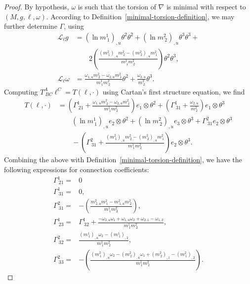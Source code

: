 \documentclass{article}
\newcommand{\ai}{A}
\newcommand{\bb}{B}
\newcommand{\cc}{C}
\theoremstyle{definition}
\theoremstyle{remark}
\begin{document}
\begin{proof}
    By hypothesis, $\omega$ is such that the torsion of $\nabla$ is minimal with respect to $(M,g,\ell,\omega)$. According to Definition~\ref{minimal-torsion-definition}, we may further determine $\Gamma$, using
    \begin{equation} \label{lie-derivs}
    \begin{aligned}
        \mathcal{L}_{\ell}g &= (\ln m^1_{~1})_{,u} \theta^2 \theta^2 + (\ln m^2_{~2})_{,u} \theta^3 \theta^3 + \\
        &\quad \quad 2 \left(\frac{(m^2_{~1})_{,u} m^2_{~2} - (m^2_{~2})_{,u} m^2_{~1}}{m^1_{~1} m^2_{~2}} \right) \theta^2 \theta^3, \\
        \mathcal{L}_\ell \omega &= \frac{\omega_{1,u} m^2_{~2} - \omega_{2,u} m^2_{~1}}{m^1_{~1} m^2_{~2}} \theta^2 + \frac{\omega_{2,u}}{m^2_{~2}} \theta^3.
    \end{aligned}
    \end{equation}
    Computing $T^\ai_{~\bb \cc}\ell^\cc = T(\ell, \cdot)$ using Cartan's first structure equation, we find
    \begin{equation}
    \begin{aligned}
        T(\ell,\cdot) &= \left( \Gamma^1_ {~21} + \frac{ \omega_{1,u} m^2_{~2}-\omega_{2,u}m^2_{~1}}{m^1_{~1} m^2_{~2}} \right) e_1 \otimes \theta^2 + \left(  \Gamma^1_ {~31} +\frac{\omega_{2,u}}{m^2_{~2}} \right) e_1 \otimes \theta^3 \\
        &\quad \quad  (\ln m^1_{~1})_{,u} e_2 \otimes \theta^2 + (\ln m^2_{~2})_{,u} e_3 \otimes \theta^3 + \Gamma^2_{~31} e_2 \otimes \theta^3 \\
        &\quad \quad -\left( \Gamma^2_{~31} +\frac{(m^2_{~1})_{,u} m^2_{~2} - (m^2_{~2})_{,u} m^2_{~1}}{m^1_{~1} m^2_{~2}} \right) e_2 \otimes \theta^3.
    \end{aligned}
    \end{equation}
    Combining the above with Definition~\ref{minimal-torsion-definition},
    we have the following expressions for connection coefficients: 
    \begin{equation}
    \begin{aligned}
        \Gamma^1_{~21} =& 0 \\ 
        \Gamma^1_{~31} =& 0, \\
         \Gamma^2_ {~31} =& -\left(\frac{m^2_{~2,u} m^2_{~1}- m^2_{~1,u} m^2_{~2} }{m^1_{~1} m^2_{~2}}\right), \\
         \Gamma^1_{~23} =& \Gamma^1_{~32} + \frac{ -\omega_{2,u} \omega_1 + \omega_{1,u} \omega_2  + \omega_{2,1}-\omega_{1,2}}{m^1_{~1} m^2_{~2}}, \\
         \Gamma^2_{~32} = & \frac{(m^1_{~1})_{,u} \omega_2 - (m^1_{~1})_{,2}}{m^1_{~1} m^2_{~2}}, \\
       \Gamma^2_{~33} = & - \left(\frac{(m^2_{~1})_{,u} \omega_2 - (m^2_{~2})_{,u} \omega_1 + (m^2_{~2})_{,1}-(m^2_{~1})_{,2}}{m^1_{~1} m^2_{~2}} \right).
    \end{aligned} \label{eqn:Thm32c}
    \end{equation}
    

\end{proof}
\end{document}
